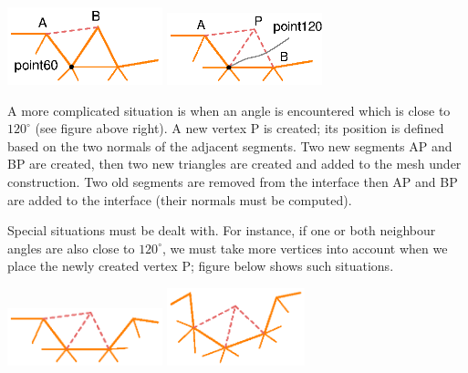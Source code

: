 { 
  \centerline{\includegraphics[width=45mm]{fill-angle-60.eps}
  \hskip5mm \includegraphics[width=45mm]{fill-angle-120.eps}} }

A more complicated situation is when an angle is encountered which is close to $ 120^\circ $
(see figure above right).
A new vertex {\codett P} is created; its position is defined based on the two normals
of the adjacent segments.
Two new segments {\codett AP} and {\codett BP} are created,
then two new triangles are created and added to the mesh under construction.
Two old segments are removed from the interface then {\codett AP} and {\codett BP} are added
to the interface (their normals must be computed).

Special situations must be dealt with.
For instance, if one or both neighbour angles are also close to $ 120^\circ $,
we must take more vertices into account when we place the newly created vertex {\codett P};
figure below shows such situations.

  \centerline{\includegraphics[width=45mm]{fill-angle-120-a.eps}
  \hskip5mm \includegraphics[width=40mm]{fill-angle-120-b.eps}}

